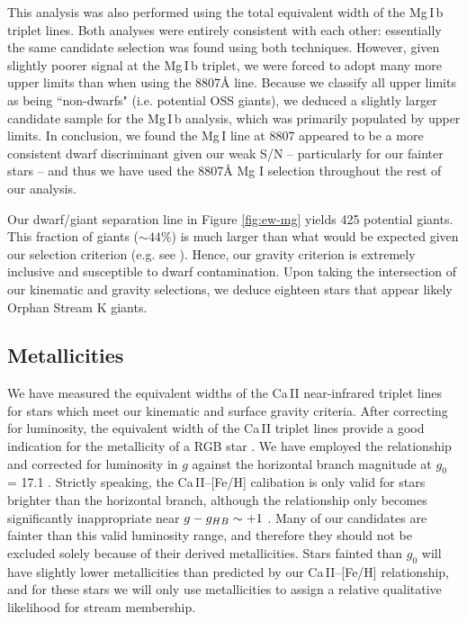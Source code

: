 \documentclass{emulateapj}
\begin{document}
This analysis was also performed using the total equivalent width of the Mg\,\textsc{I}\,b triplet lines. Both analyses were entirely consistent with each other: essentially the same candidate selection was found using both techniques. However, given slightly poorer signal at the Mg\,\textsc{I}\,b triplet, we were forced to adopt many more upper limits than when using the 8807{\AA} line. Because we classify all upper limits as being ``non-dwarfs" (i.e. potential OSS giants), we deduced a slightly larger candidate sample for the Mg\,\textsc{I}\,b analysis, which was primarily populated by upper limits. In conclusion, we found the Mg\,\textsc{I} line at 8807 appeared to be a more consistent dwarf discriminant given our weak S/N \--- particularly for our fainter stars \--- and thus we have used the 8807{\AA} Mg \textsc{I} selection throughout the rest of our analysis.

Our dwarf/giant separation line in Figure \ref{fig:ew-mg} yields 425 potential giants. This fraction of giants ($\sim{}44\%$) is much larger than what would be expected given our selection criterion (e.g. see \citet{Casey;et-al_2012a}). Hence, our gravity criterion is extremely inclusive and susceptible to dwarf contamination. Upon taking the intersection of our kinematic and gravity selections, we deduce eighteen stars that appear likely Orphan Stream K giants.


\subsection{Metallicities}
\label{sec:metallicities}

We have measured the equivalent widths of the Ca\,\textsc{II} near-infrared triplet lines for stars which meet our kinematic and surface gravity criteria. After correcting for luminosity, the equivalent width of the Ca\,\textsc{II} triplet lines provide a good indication for the metallicity of a RGB star \citep{Amandroff;Da_Costa_1991}. We have employed the \citet{Starkenburg;et-al_2010} relationship and corrected for luminosity in $g$ against the horizontal branch magnitude at $g_0$ = 17.1 \citep{Newberg;et-al_2010}. Strictly speaking, the Ca\,\textsc{II}\---[Fe/H] calibation is only valid for stars brighter than the horizontal branch, although the relationship only becomes significantly inappropriate near $g \-- g_{HB} \sim +1$ \citep{Saviane;et-al_2012}. Many of our candidates are fainter than this valid luminosity range, and therefore they should not be excluded solely because of their derived metallicities. Stars fainted than $g_0$ will have slightly lower metallicities than predicted by our Ca\,\textsc{II}\---[Fe/H] relationship, and for these stars we will only use metallicities to assign a relative qualitative likelihood for stream membership.
\end{document}
